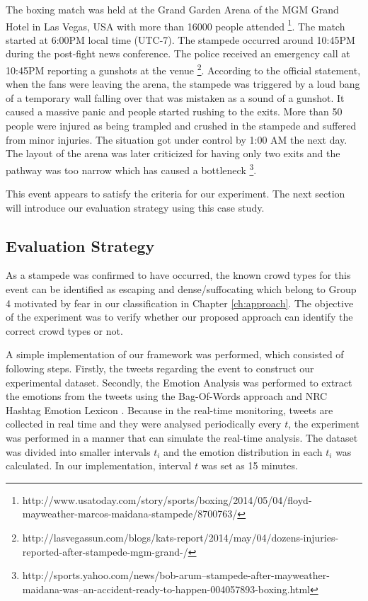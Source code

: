 The boxing match was held at the Grand Garden Arena of the MGM Grand Hotel in Las Vegas, USA with more than 16000 people attended \footnote{http://www.usatoday.com/story/sports/boxing/2014/05/04/floyd-mayweather-marcos-maidana-stampede/8700763/}. The match started at 6:00PM local time (UTC-7). The stampede occurred around 10:45PM during the post-fight news conference. The police received an emergency call at 10:45PM reporting a gunshots at the venue \footnote{http://lasvegassun.com/blogs/kats-report/2014/may/04/dozens-injuries-reported-after-stampede-mgm-grand-/}. According to the official statement, when the fans were leaving the arena, the stampede was triggered by a loud bang of a temporary wall falling over that was mistaken as a sound of a gunshot. It caused a massive panic and people started rushing to the exits. More than 50 people were injured as being trampled and crushed in the stampede and suffered from minor injuries. The situation got under control by 1:00 AM the next day. The layout of the arena was later criticized for having only two exits and the pathway was too narrow which has caused a bottleneck \footnote{http://sports.yahoo.com/news/bob-arum--stampede-after-mayweather-maidana-was--an-accident-ready-to-happen-004057893-boxing.html}.

This event appears to satisfy the criteria for our experiment. The next section will introduce our evaluation strategy using this case study.

\subsection{Evaluation Strategy}

As a stampede was confirmed to have occurred, the known crowd types for this event can be identified as escaping and dense/suffocating which belong to Group 4 motivated by fear in our classification in Chapter \ref{ch:approach}. The objective of the experiment was to verify whether our proposed approach can identify the correct crowd types or not.

A simple implementation of our framework was performed, which consisted of following steps. Firstly, the tweets regarding the event to construct our experimental dataset. Secondly, the Emotion Analysis was performed to extract the emotions from the tweets using the Bag-Of-Words approach and NRC Hashtag Emotion Lexicon \citep{mohammad2014using}. Because in the real-time monitoring, tweets are collected in real time and they were analysed periodically every \(t\), the experiment was performed in a manner that can simulate the real-time analysis. The dataset was divided into smaller intervals \(t_i\) and the emotion distribution in each \(t_i\) was calculated. In our implementation, interval \(t\) was set as 15 minutes.

